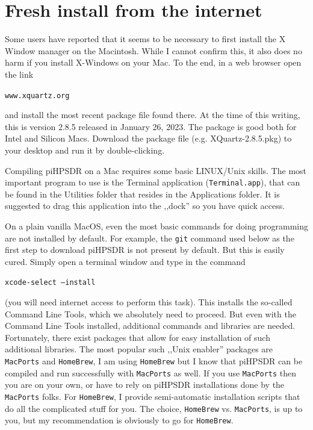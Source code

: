 \documentclass[12pt]{book}
\def\grtt#1{\texttt{\color{magenta}#1}}
\def\pH{pi\-HPSDR\xspace}
\begin{document}
\section{Fresh install from the internet}

Some users have reported that it seems to be necessary to first install the X Window manager on the Macintosh.
While I cannot confirm this, it also does no harm if you install X-Windows on your Mac.
To the end, in a web browser open the link

\texttt{www.xquartz.org}

and install the most recent package file found there. At the time of this writing, this is version 2.8.5
released in January 26, 2023. The package is good both for Intel and Silicon Macs. Download the package
file (e.g. XQuartz-2.8.5.pkg) to your desktop and run it by double-clicking.

Compiling \pH on a Mac requires some basic LINUX/Unix skills. The most important program to use is
the Terminal application (\texttt{Terminal.app}), that can be found in the Utilities folder that resides
in the Applications folder. It is suggested to drag this application into the ,,dock'' so you have quick
access.

On a plain vanilla MacOS, even the most basic commands for doing programming are not installed
by default. For example, the \grtt{git} command used below as the first step  to download \pH is
not present by default. But this is easily cured. Simply open a terminal window and type in the command

\grtt{xcode-select --install}

(you will need internet access to perform this task). This installs the so-called Command Line Tools,
which we absolutely need to proceed. But even with the Command Line Tools installed, additional
commands and libraries are needed. Fortunately, there exist packages that allow for easy installation
of such additional libraries.
The most popular such ,,Unix enabler'' packages are \texttt{MacPorts} and \texttt{HomeBrew}, I
am using
\texttt{HomeBrew} but I know that \pH can be compiled and run successfully with \texttt{MacPorts}
as well. If you use \texttt{MacPorts} then you are on your own, or
have to rely on \pH installations done by the \texttt{MacPorts} folks. For \texttt{HomeBrew},
I provide semi-automatic installation scripts that do all the complicated stuff for you. The choice,
\texttt{HomeBrew} vs. \texttt{MacPorts}, is up to you, but my recommendation is obviously
to go for \texttt{HomeBrew}.
\end{document}
